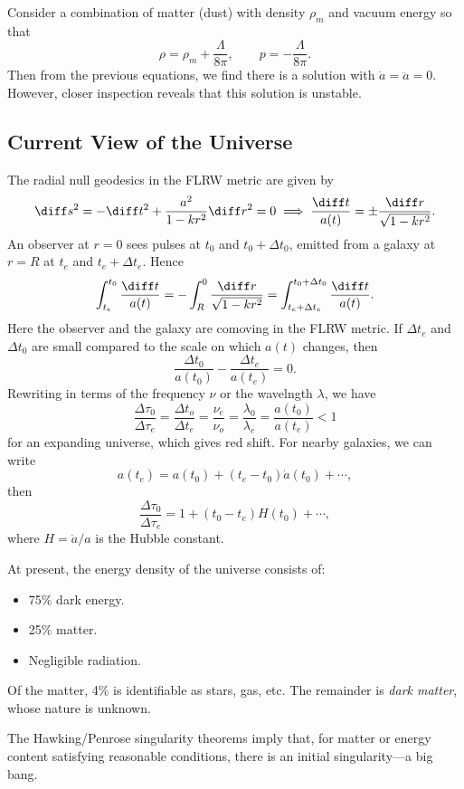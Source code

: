\documentclass[12pt]{article}
\begin{document}
Consider a combination of matter (dust) with density $\rho_m$ and vacuum energy so that
\[
\rho = \rho_m + \frac{\Lambda}{8 \pi}, \qquad p = - \frac{\Lambda}{8 \pi}.
\]
Then from the previous equations, we find there is a solution with $\dot a = \ddot a = 0$. However, closer inspection reveals that this solution is unstable.

\subsection{Current View of the Universe}
\label{sub:cvu}

The radial null geodesics in the FLRW metric are given by
\[
	\diff s^2 = - \diff t^2 + \frac{a^2}{1 - k r^2} \diff r^2 = 0 \implies \frac{\diff t}{a(t)} = \pm \frac{\diff r}{\sqrt{1 - k r^2}}.
\]
An observer at $r = 0$ sees pulses at $t_0$ and $t_0 + \Delta t_0$, emitted from a galaxy at $r = R$ at $t_e$ and $t_e + \Delta t_e$. Hence
\[
	\int_{t_e}^{t_0} \frac{\diff t}{a(t)} = - \int_R^0 \frac{\diff r}{\sqrt{1 - kr^2}} = \int_{t_e + \Delta t_e}^{t_0 + \Delta t_0} \frac{\diff t}{a(t)}.
\]
Here the observer and the galaxy are comoving in the FLRW metric. If $\Delta t_e$ and $\Delta t_0$ are small compared to the scale on which $a(t)$ changes, then
\[
\frac{\Delta t_0}{a(t_0)} - \frac{\Delta t_e}{a(t_e)} = 0.
\]
Rewriting in terms of the frequency $\nu$ or the wavelngth $\lambda$, we have
\[
\frac{\Delta \tau_0}{\Delta \tau_e} = \frac{\Delta t_o}{\Delta t_e} = \frac{\nu_e}{\nu_o} = \frac{\lambda_0}{\lambda_e} = \frac{a(t_0)}{a(t_e)} < 1
\]
for an expanding universe, which gives red shift. For nearby galaxies, we can write
\[
a(t_e) = a(t_0) + (t_e - t_0) \dot a (t_0) + \cdots,
\]
then
\[
\frac{\Delta \tau_0}{\Delta \tau_e} = 1 + (t_0 - t_e) H(t_0) + \cdots,
\]
where $H = \dot a / a$ is the Hubble constant.

At present, the energy density of the universe consists of:
\begin{itemize}
	\item 75\% dark energy.
	\item 25\% matter.
	\item Negligible radiation.
\end{itemize}
Of the matter, 4\% is identifiable as stars, gas, etc. The remainder is \emph{dark matter}, whose nature is unknown.

The Hawking/Penrose singularity theorems imply that, for matter or energy content satisfying reasonable conditions, there is an initial singularity---a big bang.
\end{document}

